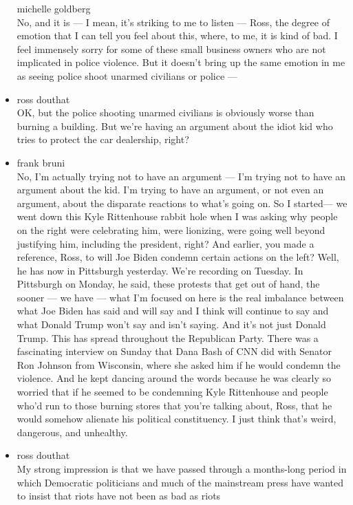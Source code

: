 \begin{itemize}
  michelle goldberg\\
  No, and it is --- I mean, it's striking to me to listen --- Ross, the
  degree of emotion that I can tell you feel about this, where, to me,
  it is kind of bad. I feel immensely sorry for some of these small
  business owners who are not implicated in police violence. But it
  doesn't bring up the same emotion in me as seeing police shoot unarmed
  civilians or police ---
\item
  ross douthat\\
  OK, but the police shooting unarmed civilians is obviously worse than
  burning a building. But we're having an argument about the idiot kid
  who tries to protect the car dealership, right?
\item
  frank bruni\\
  No, I'm actually trying not to have an argument --- I'm trying not to
  have an argument about the kid. I'm trying to have an argument, or not
  even an argument, about the disparate reactions to what's going on. So
  I started--- we went down this Kyle Rittenhouse rabbit hole when I was
  asking why people on the right were celebrating him, were lionizing,
  were going well beyond justifying him, including the president, right?
  And earlier, you made a reference, Ross, to will Joe Biden condemn
  certain actions on the left? Well, he has now in Pittsburgh yesterday.
  We're recording on Tuesday. In Pittsburgh on Monday, he said, these
  protests that get out of hand, the sooner --- we have --- what I'm
  focused on here is the real imbalance between what Joe Biden has said
  and will say and I think will continue to say and what Donald Trump
  won't say and isn't saying. And it's not just Donald Trump. This has
  spread throughout the Republican Party. There was a fascinating
  interview on Sunday that Dana Bash of CNN did with Senator Ron Johnson
  from Wisconsin, where she asked him if he would condemn the violence.
  And he kept dancing around the words because he was clearly so worried
  that if he seemed to be condemning Kyle Rittenhouse and people who'd
  run to those burning stores that you're talking about, Ross, that he
  would somehow alienate his political constituency. I just think that's
  weird, dangerous, and unhealthy.
\item
  ross douthat\\
  My strong impression is that we have passed through a months-long
  period in which Democratic politicians and much of the mainstream
  press have wanted to insist that riots have not been as bad as riots

\end{itemize}
